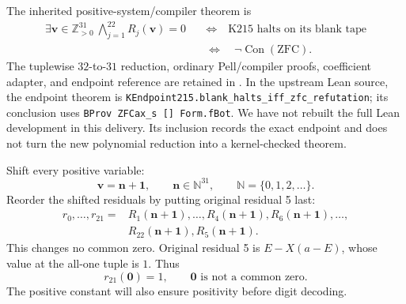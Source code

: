 \documentclass[11pt,a4paper]{article}
\theoremstyle{remark}
\newcommand{\Z}{\mathbb Z}
\newcommand{\N}{\mathbb N}
\newcommand{\Con}{\operatorname{Con}}
\newcommand{\file}[1]{\texttt{\path{#1}}}
\begin{document}
The inherited positive-system/compiler theorem is
\begin{equation}\label{eq:inherited}
\begin{split}
\exists\mathbf v\in\Z_{>0}^{31}\ 
\bigwedge_{j=1}^{22}R_j(\mathbf v)=0
&\quad\Longleftrightarrow\quad
\text{K215 halts on its blank tape}\\
&\quad\Longleftrightarrow\quad
\neg\Con(\mathrm{ZFC}).
\end{split}
\end{equation}
The tuplewise \(32\)-to-\(31\) reduction, ordinary Pell/compiler proofs,
coefficient adapter, and endpoint reference are retained in
\file{vendor/}. In the upstream Lean source, the endpoint theorem is
\texttt{KEndpoint215.blank\_halts\_iff\_zfc\_refutation}; its conclusion
uses \texttt{BProv ZFCax\_s [] Form.fBot}. We have not rebuilt the full
Lean development in this delivery. Its inclusion records the exact
endpoint and does not turn the new polynomial reduction into a
kernel-checked theorem.

Shift every positive variable:
\[
\mathbf v=\mathbf n+\mathbf1,\qquad \mathbf n\in\N^{31},
\qquad \N=\{0,1,2,\ldots\}.
\]
Reorder the shifted residuals by putting original residual 5 last:
\[
\begin{split}
r_0,\ldots,r_{21}
={}&R_1(\mathbf n+\mathbf1),\ldots,R_4(\mathbf n+\mathbf1),
R_6(\mathbf n+\mathbf1),\ldots,\\
&R_{22}(\mathbf n+\mathbf1),R_5(\mathbf n+\mathbf1).
\end{split}
\]
This changes no common zero. Original residual 5 is \(E-X(a-E)\), whose
value at the all-one tuple is \(1\). Thus
\begin{equation}\label{eq:constant}
r_{21}(\mathbf0)=1,\qquad
\mathbf0\text{ is not a common zero}.
\end{equation}
The positive constant will also ensure positivity before digit decoding.
\end{document}

